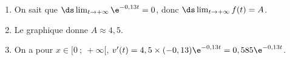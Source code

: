 \begin{enumerate}
\item On sait que $\ds\lim _{t\to +\infty} \e^{-0,13t} = 0$, donc $\ds\lim _{t\to +\infty} f(t) = A$.

\item Le graphique donne $A \approx 4,5$.

\item On a pour $x \in [0~;~+ \infty[$, \: $v'(t) = 4,5 \times (- 0,13) \e^{-0,13t} = 0,585\e^{-0,13t}$.
\end{enumerate}

\bigskip

